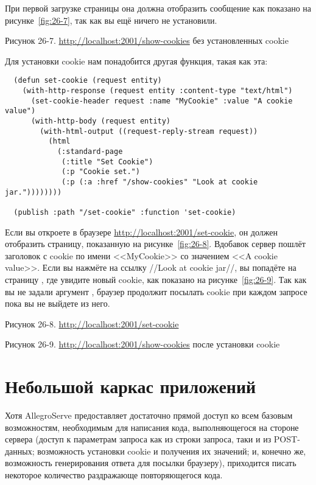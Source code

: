 При первой загрузке страницы  она должна
отобразить сообщение  как показано на рисунке~\ref{fig:26-7}, так как
вы ещё ничего не установили.

Рисунок 26-7. \url{http://localhost:2001/show-cookies} без установленных cookie

Для установки cookie нам понадобится другая функция, такая как эта:

\begin{lstlisting}
  (defun set-cookie (request entity)
    (with-http-response (request entity :content-type "text/html")
      (set-cookie-header request :name "MyCookie" :value "A cookie value")
      (with-http-body (request entity)
        (with-html-output ((request-reply-stream request))
          (html 
            (:standard-page
             (:title "Set Cookie")
             (:p "Cookie set.")
             (:p (:a :href "/show-cookies" "Look at cookie jar."))))))))

  (publish :path "/set-cookie" :function 'set-cookie)
\end{lstlisting}

Если вы откроете в браузере \url{http://localhost:2001/set-cookie}, он должен отобразить
страницу, показанную на рисунке~\ref{fig:26-8}. Вдобавок сервер пошлёт заголовок
 с cookie по имени <<MyCookie>> со значением <<A cookie value>>. Если вы
нажмёте на ссылку //Look at cookie jar//, вы попадёте на страницу ,
где увидите новый cookie, как показано на рисунке~\ref{fig:26-9}. Так как вы не задали
аргумент , браузер продолжит посылать cookie при каждом запросе пока вы не
выйдете из него.

Рисунок 26-8. \url{http://localhost:2001/set-cookie}

Рисунок 26-9. \url{http://localhost:2001/show-cookies} после установки cookie

\section{Небольшой каркас приложений}

Хотя AllegroServe предоставляет достаточно прямой доступ ко всем базовым возможностям,
необходимым для написания кода, выполняющегося на стороне сервера (доступ к параметрам
запроса как из строки запроса, таки и из POST-данных; возможность установки cookie и
получения их значений; и, конечно же, возможность генерирования ответа для посылки
браузеру), приходится писать некоторое количество раздражающе повторяющегося кода.

